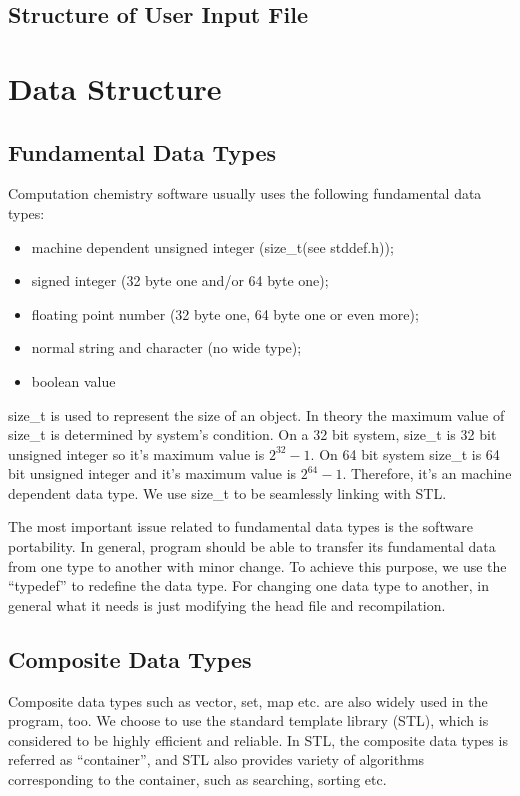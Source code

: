 \subsection{Structure of User Input File}
%
%
%


\section{Data Structure}
%
%
%

\subsection{Fundamental Data Types}
%
%
%
Computation chemistry software usually uses the following fundamental data 
types:
\begin{itemize}
 \item machine dependent unsigned integer (size\_t(see stddef.h));
 \item signed integer (32 byte one and/or 64 byte one);
 \item floating point number (32 byte one, 64 byte one or even more);
 \item normal string and character (no wide type);
 \item boolean value
\end{itemize}
size\_t is used to represent the size of an object. In theory the maximum
value of size\_t is determined by system's condition. On a 32 bit system,
size\_t is 32 bit unsigned integer so it's maximum value is $2^{32}-1$.
On 64 bit system size\_t is 64 bit unsigned integer and it's maximum 
value is $2^{64}-1$. Therefore, it's an machine dependent data type.
We use size\_t to be seamlessly linking with STL. 

The most important issue related to fundamental data types is the software 
portability. In general, program should be able to transfer its fundamental 
data from one type to another with minor change. To achieve this purpose, 
we use the ``typedef'' to redefine the data type. For changing one data type 
to another, in general what it needs is just modifying the head file and 
recompilation.

\subsection{Composite Data Types}
\label{composite_data_types}
%
%
%
Composite data types such as vector, set, map etc. are also widely used 
in the program, too. We choose to use the standard template library (STL),
which is considered to be highly efficient and reliable. In STL, the composite
data types is referred as ``container'', and STL also provides variety of 
algorithms corresponding to the container, such as searching, sorting etc.

